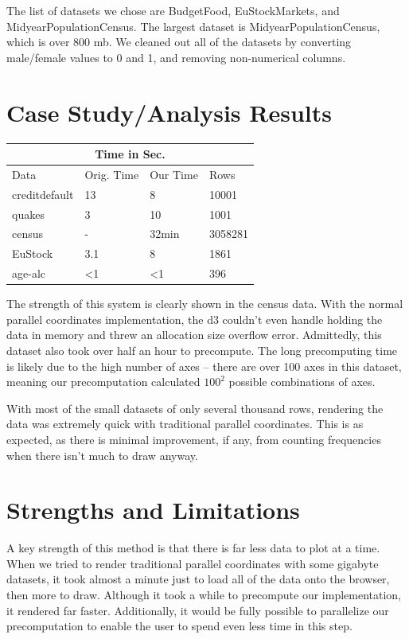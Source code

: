 \documentclass[	DIV=calc,%
			paper=a4,%
			fontsize=11pt,%
			twocolumn]{scrartcl}					%
\begin{document}
The list of datasets we chose are BudgetFood, EuStockMarkets, and MidyearPopulationCensus. The largest dataset is MidyearPopulationCensus, which is over 800 mb. We
cleaned out all of the datasets by converting male/female values to 0 and 1, and removing non-numerical columns. 

\section {Case Study/Analysis Results}
\begin{tabular}{ |p{2cm}||p{1cm}||p{1cm}||p{1.2cm}|  }
 \hline
 \multicolumn{4}{|c|}{Time in Sec.} \\
 \hline
 Data& Orig. Time& Our Time & Rows\\
 \hline
 creditdefault& 13 & 8 & 10001\\
 quakes&   3 & 10 & 1001\\
 census &- &32min & 3058281\\
 EuStock &3.1 &8 & 1861\\
 age-alc &<1 &<1 & 396\\
 \hline
\end{tabular}

The strength of this system is clearly shown in the census data. With the normal 
parallel coordinates implementation, the d3 couldn't even handle holding the data in 
memory and threw an allocation size overflow error. Admittedly, this dataset also
took over half an hour to precompute. The long precomputing time is likely due to
the high number of axes -- there are over 100 axes in this dataset, meaning 
our precomputation calculated $100^2$ possible combinations of axes. 

With most of the small datasets of only several thousand rows, rendering the data
was extremely quick with traditional parallel coordinates. This is as expected, as 
there is minimal improvement, if any, from counting frequencies when there isn't much to draw anyway. 


\section {Strengths and Limitations}
A key strength of this method is that there is far less data to plot at a time. When we tried to render traditional parallel coordinates with some gigabyte datasets, it took almost a minute just to load all of the data onto
the browser, then more to draw. Although it took a while to precompute our implementation, it rendered far faster. Additionally, it would be fully possible to parallelize our
precomputation to enable the user to spend even less time in this step. 
\end{document}
